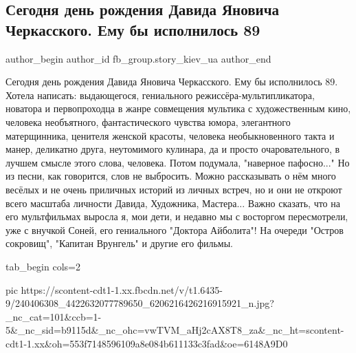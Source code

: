  
 
 
 
 
 
\subsection{Сегодня день рождения Давида Яновича Черкасского. Ему бы исполнилось 89}
\label{sec:23_08_2021.fb.fb_group.story_kiev_ua.1.david_cherkasskij_birthday}
 
\ifcmt
 author_begin
   author_id fb_group.story_kiev_ua
 author_end
\fi


Сегодня день рождения Давида Яновича Черкасского. Ему бы исполнилось 89. Хотела
написать: выдающегося, гениального режиссёра-мультипликатора, новатора и
первопроходца в жанре совмещения мультика с художественным кино, человека
необъятного, фантастического чувства юмора, элегантного матерщинника, ценителя
женской красоты, человека необыкновенного такта и манер, деликатно друга,
неутомимого кулинара, да и просто очаровательного, в лучшем смысле этого слова,
человека. Потом подумала, "наверное пафосно..." Но из песни, как говорится,
слов не выбросить. Можно рассказывать о нём много весёлых и не очень приличных
историй из личных встреч, но и они не откроют всего масштаба личности Давида,
Художника, Мастера... Важно сказать, что на его мультфильмах выросла я, мои
дети, и недавно мы с восторгом пересмотрели, уже с внучкой Соней, его
гениального "Доктора Айболита"! На очереди "Остров сокровищ", "Капитан
Врунгель" и другие его фильмы. 

\ifcmt
  tab_begin cols=2

     pic https://scontent-cdt1-1.xx.fbcdn.net/v/t1.6435-9/240406308_4422632077789650_6206216426216915921_n.jpg?_nc_cat=101&ccb=1-5&_nc_sid=b9115d&_nc_ohc=vwTVM_aHj2cAX8T8_za&_nc_ht=scontent-cdt1-1.xx&oh=553f7148596109a8e084b611133c3fad&oe=6148A9D0

